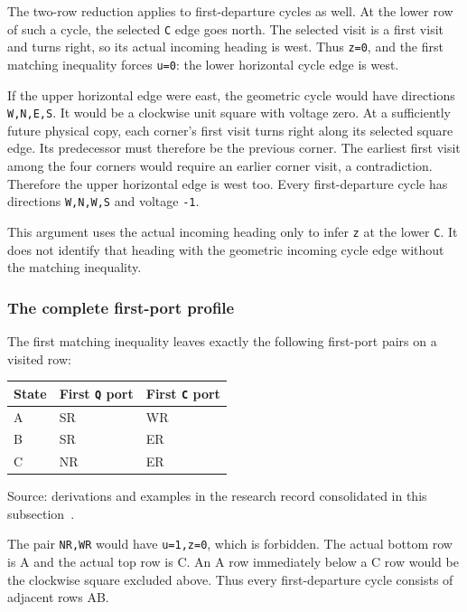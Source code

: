 \documentclass[11pt,letterpaper]{article}
\theoremstyle{plain}
\theoremstyle{definition}
\begin{document}
\begin{NoHyper}
The two-row reduction applies to first-departure cycles as well. At the lower row of such a cycle, the selected \texttt{C} edge goes north. The selected visit is a first visit and turns right, so its actual incoming heading is west. Thus \texttt{z=0}, and the first matching inequality forces \texttt{u=0}: the lower horizontal cycle edge is west.

If the upper horizontal edge were east, the geometric cycle would have directions \texttt{W,N,E,S}. It would be a clockwise unit square with voltage zero. At a sufficiently future physical copy, each corner's first visit turns right along its selected square edge. Its predecessor must therefore be the previous corner. The earliest first visit among the four corners would require an earlier corner visit, a contradiction. Therefore the upper horizontal edge is west too. Every first-departure cycle has directions \texttt{W,N,W,S} and voltage \texttt{-1}.

This argument uses the actual incoming heading only to infer \texttt{z} at the lower \texttt{C}. It does not identify that heading with the geometric incoming cycle edge without the matching inequality.

\subsubsection{The complete first-port profile}

The first matching inequality leaves exactly the following first-port pairs on a visited row:

{\def\LTcaptype{table} %
\begin{longtable}[]{@{}lll@{}}
\toprule\noalign{}
State & First \texttt{Q} port & First \texttt{C} port \\
\midrule\noalign{}
\endhead
\bottomrule\noalign{}
\endlastfoot
A & SR & WR \\
B & SR & ER \\
C & NR & ER \\
\end{longtable}
{\footnotesize Source: derivations and examples in the research record consolidated in this subsection~\cite{Repo}.\par}
}

The pair \texttt{NR,WR} would have \texttt{u=1,z=0}, which is forbidden. The actual bottom row is A and the actual top row is C. An A row immediately below a C row would be the clockwise square excluded above. Thus every first-departure cycle consists of adjacent rows AB.


\end{NoHyper}
\end{document}
